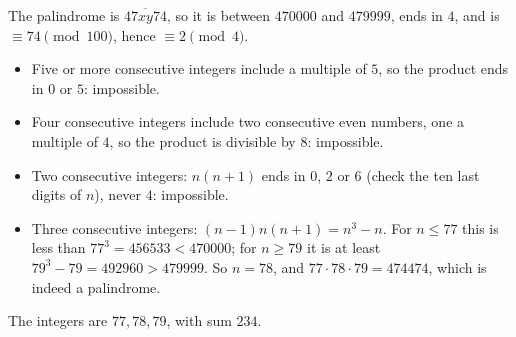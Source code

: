 The palindrome is $\overline{47xy74}$, so it is between $470000$ and $479999$, ends in $4$, and is $\equiv74\pmod{100}$, hence $\equiv2\pmod4$.
\begin{itemize}
\item Five or more consecutive integers include a multiple of $5$, so the product ends in $0$ or $5$: impossible.
\item Four consecutive integers include two consecutive even numbers, one a multiple of $4$, so the product is divisible by $8$: impossible.
\item Two consecutive integers: $n(n+1)$ ends in $0$, $2$ or $6$ (check the ten last digits of $n$), never $4$: impossible.
\item Three consecutive integers: $(n-1)n(n+1)=n^3-n$. For $n\le77$ this is less than $77^3=456533<470000$; for $n\ge79$ it is at least $79^3-79=492960>479999$. So $n=78$, and $77\cdot78\cdot79=474474$, which is indeed a palindrome.
\end{itemize}
The integers are $77,78,79$, with sum $\boxed{234}$.
